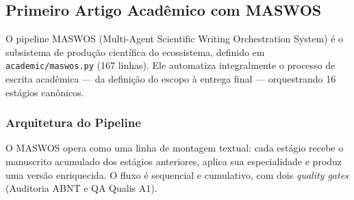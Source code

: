 \subsection{Primeiro Artigo Acadêmico com MASWOS}
\label{sec:primeiro-artigo}

O pipeline MASWOS (Multi-Agent Scientific Writing Orchestration System) é o subsistema de produção científica do ecossistema, definido em \texttt{academic/maswos.py} (167 linhas). Ele automatiza integralmente o processo de escrita acadêmica — da definição do escopo à entrega final — orquestrando 16 estágios canônicos.

\subsubsection{Arquitetura do Pipeline}

O MASWOS opera como uma linha de montagem textual: cada estágio recebe o manuscrito acumulado dos estágios anteriores, aplica sua especialidade e produz uma versão enriquecida. O fluxo é sequencial e cumulativo, com dois \textit{quality gates} (Auditoria ABNT e QA Qualis A1).

